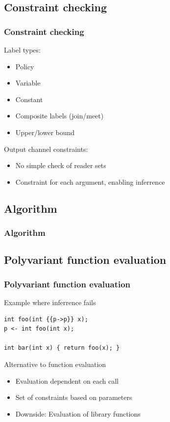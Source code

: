 \documentclass[10pt]{beamer}
\begin{document}
\subsection{Constraint checking}
\begin{frame}
  \frametitle{Constraint checking}

  Label types:
  \begin{itemize}
    \item Policy
    \item Variable
    \item Constant
    \item Composite labels (join/meet)
    \item Upper/lower bound
  \end{itemize}
  \vspace{1em}
  Output channel constraints:
  \begin{itemize}
    \item No simple check of reader sets
    \item Constraint for each argument, enabling inferrence
  \end{itemize}
\end{frame}

\subsection{Algorithm}
\begin{frame}
  \frametitle{Algorithm}
  \centering

  \scalebox{.9}{
  
  }
\end{frame}

\subsection{Polyvariant function evaluation}
\begin{frame}[fragile]
  \frametitle{Polyvariant function evaluation}

  Example where inferrence fails
\begin{lstlisting}[style=dlmc]
int foo(int {{p->p}} x);
p <- int foo(int x);

int bar(int x) { return foo(x); }
\end{lstlisting}
  \vspace{1em}
  Alternative to function evaluation
  \begin{itemize}
    \item Evaluation dependent on each call
    \item Set of constraints based on parameters
    \item Downside: Evaluation of library functions
  \end{itemize}
\end{frame}
\end{document}
